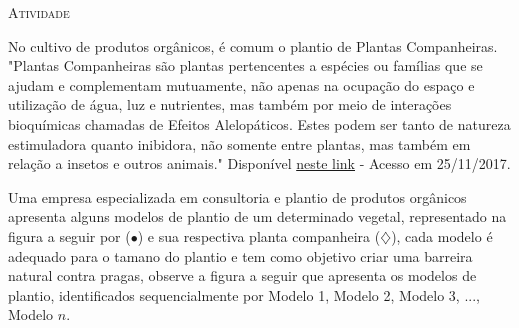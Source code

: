 \documentclass[10 pt,usenames,dvipsnames, oneside]{article}
\begin{document}
\bigskip
\begin{center}
{\large \scshape Atividade}
\end{center}
\fi

No cultivo de produtos orgânicos, é comum o plantio de Plantas Companheiras. "Plantas Companheiras são plantas pertencentes a espécies ou famílias que se ajudam e complementam mutuamente, não apenas na ocupação do espaço e utilização de água, luz e nutrientes, mas também por meio de interações bioquímicas chamadas de Efeitos Alelopáticos. Estes podem ser tanto de natureza estimuladora quanto inibidora, não somente entre plantas, mas também em relação a insetos e outros animais." Disponível \href{https://permacoletivo.files.wordpress.com/2008/06/manual-horta-organica-domestica.pdf}{neste link} - Acesso em 25/11/2017.

Uma empresa especializada em consultoria e plantio de produtos orgânicos apresenta alguns modelos de plantio de um determinado vegetal, representado na figura a seguir por ({\Large $\bullet$}) e sua respectiva planta companheira ({\Large$\diamondsuit$}), cada modelo é adequado para o tamano do plantio e tem como objetivo criar uma barreira natural contra pragas, observe a figura a seguir que apresenta os modelos de plantio, identificados sequencialmente por Modelo 1, Modelo 2, Modelo 3, ..., Modelo $n$.
\end{document}
